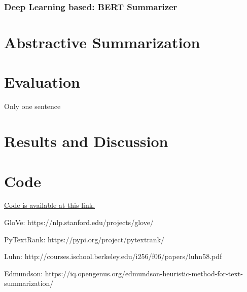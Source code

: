 \documentclass[fleqn,10pt]{SelfArx} %
\begin{document}
\subsubsection{Deep Learning based: BERT Summarizer}
\section{Abstractive Summarization}
\section{Evaluation}
Only one sentence
\section{Results and Discussion}
\section*{Code}
\href{https://github.com/RCrvro/Text-Summarization-Project}{Code is available at this link.}



GloVe: https://nlp.stanford.edu/projects/glove/

PyTextRank: https://pypi.org/project/pytextrank/

Luhn: http://courses.ischool.berkeley.edu/i256/f06/papers/luhn58.pdf

Edmundson: https://iq.opengenus.org/edmundson-heuristic-method-for-text-summarization/
\end{document}
